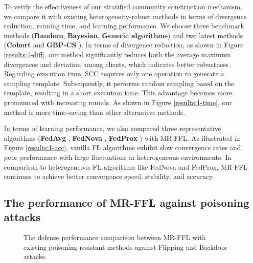 \documentclass[lettersize,journal]{IEEEtran}
\begin{document}
To verify the effectiveness of our stratified community construction mechanism, we compare it with existing heterogeneity-robust methods in terms of divergence reduction, running time, and learning performance. We choose three benchmark methods (\textbf{Random}, \textbf{Bayesian}, \textbf{Generic algorithms}) and two latest methods (\textbf{Cohort} \cite{hiessl2022cohort} and \textbf{GBP-CS} \cite{li2022data}). 
In terms of divergence reduction, as shown in Figure \ref{results:1-diff}, our method significantly reduces both the average maximum divergences and deviation among clients, which indicates better robustness. 
Regarding execution time, SCC requires only one operation to generate a sampling template. Subsequently, it performs random sampling based on the template, resulting in a short execution time. This advantage becomes more pronounced with increasing rounds. As shown in Figure \ref{results:1-time}, our method is more time-saving than other alternative methods.%



In terms of learning performance, we also compared three representative algorithms (\textbf{FedAvg} \cite{li2019convergence-fedavg}, \textbf{FedNova} \cite{wang2020tackling-fednova}, \textbf{FedProx} \cite{yuan2022convergence-fedprox}) with MR-FFL. As illustrated in Figure \ref{results:1-acc}, vanilla FL algorithms exhibit slow convergence rates and poor performance with large fluctuations in heterogeneous environments. In comparison to heterogeneous FL algorithms like FedNova and FedProx, MR-FFL continues to achieve better convergence speed, stability, and accuracy.

\subsection{The performance of MR-FFL against poisoning attacks}
\begin{figure*}[!t]
\centering
{}
\hfil
{}
\hfil
{}
\hfil
{}
\caption{The defense performance comparison between MR-FFL with existing poisoning-resistant methods against Flipping and Backdoor attacks.}
\label{results:0-acc}
\end{figure*}
\end{document}
